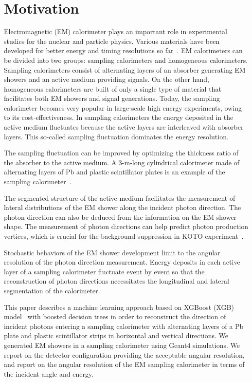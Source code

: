 \documentclass[preprint,12pt,times,a4paper]{elsarticle}
\begin{document}
\section{Motivation}
\label{sec:mot}
Electromagnetic (EM) calorimeter plays an important role in experimental studies for the nuclear and particle physics. Various materials have been developed for better energy and timing resolutions so far~\cite{Calorimeter}. EM calorimeters can be divided into two groups: sampling calorimeters and homogeneous calorimeters. Sampling calorimeters consist of alternating layers of an absorber generating EM showers and an active medium providing signals. On the other hand, homogeneous calorimeters are built of only a single type of material that facilitates both EM showers and signal generations. Today, the sampling calorimeter becomes very popular in large-scale high energy experiments, owing to its cost-effectiveness. In sampling calorimeters the energy deposited in the active medium fluctuates because the active layers are interleaved with absorber layers. This so-called sampling fluctuation dominates the energy resolution.

The sampling fluctuation can be improved by optimizing the thickness ratio of the absorber to the active medium. A 3-m-long cylindrical calorimeter made of alternating layers of Pb and plastic scintillator plates is an example of the sampling calorimeter~\cite{Murayama:2020mcp}.

The segmented structure of the active medium facilitates the measurement of lateral distributions of the EM shower along the incident photon direction. The photon direction can also be deduced from the information on the EM shower shape. The measurement of photon directions can help predict photon production vertices, which is crucial for the background suppression in KOTO experiment~\cite{KOTO:2012}.

Stochastic behaviors of the EM shower development limit to the angular resolution of the photon direction measurement. Energy deposits in each active layer of a sampling calorimeter fluctuate event by event so that the reconstruction of photon directions necessitates the longitudinal and lateral segmentation of the calorimeter.

This paper describes a machine learning approach based on XGBoost (XGB) model~\cite{xgboost:2016} with boosted decision trees in order to reconstruct the direction of incident photons entering a sampling calorimeter with alternating layers of a Pb plate and plastic scintillator strips in horizontal and vertical directions. We generated EM showers in a sampling calorimeter using Geant4 simulations. We report on the detector configuration providing the acceptable angular resolution, and report on the angular resolution of the EM sampling calorimeter in terms of the incident angle and energy.
\end{document}
